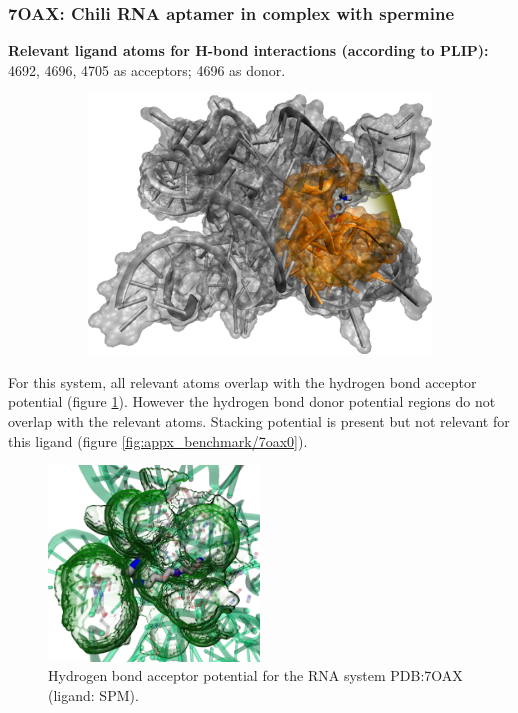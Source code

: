     \subsubsection{7OAX: Chili RNA aptamer in complex with spermine}
      \textbf{Relevant ligand atoms for H-bond interactions (according to PLIP):} 4692, 4696, 4705 as acceptors; 4696 as donor.

      \begin{figure}[H] \centering
        \begin{subfigure}[c]{0.3\textwidth} \centering
          \includegraphics[width=1\textwidth]{figures/results/ps_rna/7oax1.png}
        \end{subfigure}
        \begin{subfigure}[c]{0.3\textwidth} \centering
        \end{subfigure}
      \end{figure}

      For this system, all relevant atoms overlap with the hydrogen bond acceptor potential (figure \ref{fig:benchmark/7oax0}). However the hydrogen bond donor potential regions do not overlap with the relevant atoms. Stacking potential is present but not relevant for this ligand (figure \ref{fig:appx_benchmark/7oax0}).

      \begin{figure}[H]
        \centering
        \includegraphics[width=0.5\textwidth]{figures/results/benchmark_rna/7oax0.png}
        \caption{\label{fig:benchmark/7oax0} Hydrogen bond acceptor potential for the RNA system PDB:7OAX (ligand: SPM).}
      \end{figure}
    \pagebreak


